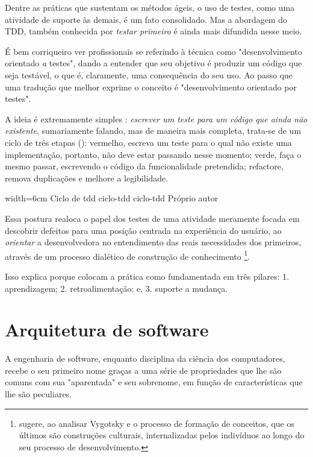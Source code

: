       Dentre as práticas que sustentam os métodos ágeis, o uso de testes, como uma atividade de suporte às demais, é um fato consolidado. Mas a abordagem do TDD, também conhecida por \emph{testar primeiro} é ainda mais difundida nesse  meio.

      É bem corriqueiro ver profissionais se referindo à  técnica como "desenvolvimento orientado \emph{a} testes", dando a entender que seu objetivo é produzir um código que seja testável, o que é, claramente, uma consequência do seu uso. Ao passo que uma tradução que melhor exprime o conceito é "desenvolvimento orientado {por} testes".

      A ideia é extremamente simples \cite[p.1]{FreemanPryce2009}: \emph{escrever um teste para um código que ainda não existente}, sumariamente falando, mas de maneira mais completa, trata-se de um ciclo de três etapas\cite[pág. x] {Beck2003} (): vermelho,  escreva um teste para o qual não existe uma implementação, portanto, não deve estar passando nesse momento; verde, faça o mesmo passar, escrevendo o código da funcionalidade pretendida; refactore, remova duplicações e melhore a legibilidade.

      \imagem
        {width=6cm}
        {Ciclo de tdd}
        {ciclo-tdd}
        {ciclo-tdd}
        {Próprio autor\footnotemark}

      Essa postura realoca o papel dos testes de uma atividade meramente focada em descobrir defeitos para uma posição centrada na experiência do usuário, ao  \emph{orientar} a desenvolvedora no entendimento das reais necessidades dos primeiros, através de um processo dialético de construção de conhecimento \footnote{ sugere, ao analisar Vygotsky e o processo de formação de conceitos, que os últimos são construções culturais, internalizadas pelos indivíduos ao longo do seu processo de desenvolvimento.}.

      Isso explica porque  colocam a prática como fundamentada em três pilares: 1. aprendizagem; 2. retroalimentação; e, 3. suporte a mudança.

  \section{Arquitetura de software}

    A engenharia de software, enquanto disciplina da ciência dos computadores, recebe o seu primeiro nome graças a uma série de propriedades que lhe são comuns com sua "aparentada" e seu sobrenome, em função de características que lhe são peculiares.

